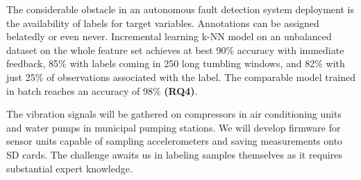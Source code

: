 The considerable obstacle in an autonomous fault detection system deployment is the availability of labels for target variables. Annotations can be assigned belatedly or even never. Incremental learning k-NN model on an unbalanced dataset on the whole feature set achieves at best 90\% accuracy with immediate feedback, 85\% with labels coming in 250 long tumbling windows, and 82\% with just 25\% of observations associated with the label. The comparable model trained in batch reaches an accuracy of 98\% \textbf{(RQ4)}.

The vibration signals will be gathered on compressors in air conditioning units and water pumps in municipal pumping stations. We will develop firmware for sensor units capable of sampling accelerometers and saving measurements onto SD cards. The challenge awaits us in labeling samples themselves as it requires substantial expert knowledge. 




